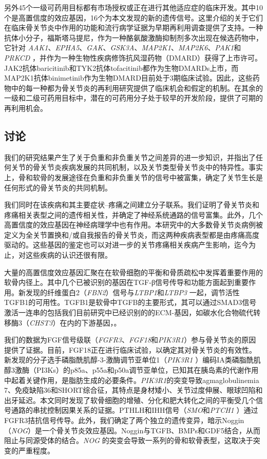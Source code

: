 另外45个一级可药用目标都有市场授权或正在进行其他适应症的临床开发。其中10个是高置信度的效应基因，16个为本文发现的新的遗传信号。这里介绍的关于它们在临床骨关节炎中作用的功能和流行病学证据为早期再利用调查提供了支持。一种抗体小分子，福斯塔马提尼，作为一种酪氨酸激酶抑制剂多次出现在候选药物中，它针对\emph{
AAK1}、\emph{EPHA5}、\emph{GAK}、\emph{GSK3A}、\emph{MAP2K1}、\emph{MAP2K6}、\emph{PAK1}和\emph{PRKCD}
，并作为一种生物性疾病修饰抗风湿药物（DMARD）获得了上市许可。JAK2抗体baricitinib和TYK2抗体tofacitinib都作为生物DMARDs上市，而MAP2K1抗体binimetinib作为生物DMARD目前处于3期临床试验。因此，这些药物中的每一种都为骨关节炎的再利用研究提供了临床机会和假定的机制。在其余的一级和二级可药用目标中，潜在的可药用分子处于较早的开发阶段，提供了可期的再利用机会。


\subsection*{讨论}

我们的研究结果产生了关于负重和非负重关节之间差异的进一步知识，并指出了任何关节的骨关节炎疾病发展的共同机制，以及关节类型骨关节炎中的特异性。事实上，骨和软骨的发展途径在负重和非负重关节的信号中被富集，确定了关节生长是任何形式的骨关节炎的共同机制。

我们同时在该疾病和其主要症状--疼痛之间建立分子联系。我们证明了骨关节炎和疼痛相关表型之间的遗传相关性，并确定了神经系统通路的信号富集。此外，几个高置信度的效应基因在神经病理学中也有作用。本研究中的大多数骨关节炎病例被定义为全关节置换和/或自我报告的骨关节炎，而这两种疾病表型都是由疼痛高度驱动的。这些基因的鉴定也可以对进一步的关节疼痛相关疾病产生影响，迄今为止，对这些疾病的认识还很有限。

大量的高置信度效应基因汇聚在在软骨细胞的平衡和骨质疏松中发挥着重要作用的软骨内径上。其中几个已被识别的基因在TGF-β信号传导和功能方面起到重要作用。新发现的纤维蛋白2（\emph{FBN2}）信号与\emph{LTBP1}和\emph{LTBP3}
一起，调节活性TGFB1的可用性。TGFB1是软骨中TGFB的主要形式，其可以通过SMAD3信号激活一连串的包括我们目前研究中已经识别的的ECM-基因，如碳水化合物硫代转移酶3（\emph{CHST3}）在内的下游基因，。

我们的数据为FGF信号级联（\emph{FGFR3}、\emph{FGF18}和\emph{PIK3R1}）参与骨关节炎的原因提供了证据。目前，FGF18正在进行临床试验，以确定其对骨关节炎的有效性。新发现的分子选手磷脂酰肌醇-3-激酶调节亚单位1（\emph{PIK3R1}
）编码IA类磷脂酰肌醇3激酶（PI3Ks）的p85a、p55a和p50a调节亚单位，已知其在胰岛素的代谢作用中起着关键作用，是脂肪生成的必要条件。\emph{PIK3R1}的突变导致agmaglobulinemia
7、免疫缺陷36和SHORT综合征，其特点是身材矮小、关节过度伸展、眼球凹陷和出牙延迟。本文同时发现了软骨细胞的增殖、分化和肥大转化之间的平衡受几个信号通路的串扰控制因果关系的证据。PTHLH和IHH信号（\emph{SMO}和\emph{PTCH1}
）通过FGFR3拮抗信号传导。此外，我们确定了两个独立的遗传变异，暗示Noggin（\emph{NOG}）是一个骨关节炎效应基因。Noggin与TGFB、BMPs和GDF5结合，从而阻止与同源受体的结合。\emph{NOG}
的突变会导致一系列的骨和软骨表型，这取决于突变的严重程度。

